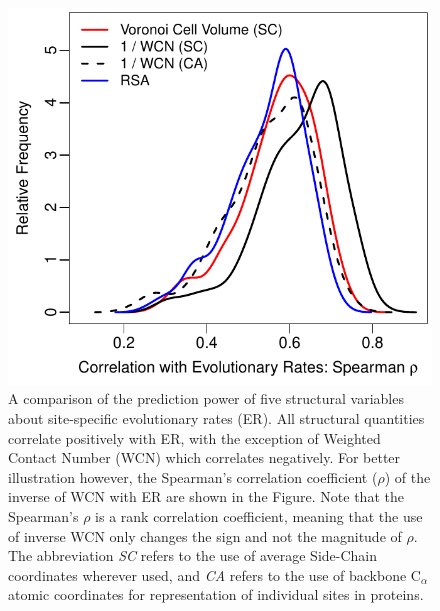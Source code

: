 \documentclass[11pt]{article}
\begin{document}
    \begin{figure}
        \begin{center}
        \includegraphics[width=5.5in]{best_structural_predictors_of_ER_limited.pdf}
        \end{center}
        \caption{A comparison of the prediction power of five structural variables about site-specific evolutionary rates (ER). All structural quantities correlate positively with ER, with the exception of Weighted Contact Number (WCN) which correlates negatively. For better illustration however, the Spearman's correlation coefficient ($\rho$) of the inverse of WCN with ER are shown in the Figure. Note that the Spearman's $\rho$ is a rank correlation coefficient, meaning that the use of inverse WCN only changes the sign and not the magnitude of $\rho$. The abbreviation {\it SC} refers to the use of average Side-Chain coordinates wherever used, and {\it CA} refers to the use of backbone C$_\alpha$ atomic coordinates for representation of individual sites in proteins.}
        \label{fig:best_predictorER}
    \end{figure}
\end{document}
